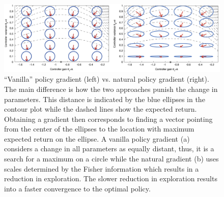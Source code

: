 \begin{figure}[!htb]
    \centering
    \includegraphics[width=1\linewidth]{Images/4_0_euclidean_vs_natural}
	\caption[``Vanilla'' policy gradient vs. natural policy gradient]{``Vanilla'' policy gradient (left) vs. natural policy gradient (right). The main difference is how the two approaches punish the change in parameters. This distance is 	indicated by the blue ellipses in the contour plot while the dashed lines show the expected return. Obtaining a gradient then corresponds to finding a vector pointing from the center of the ellipses to the location with maximum expected return on the ellipse. A vanilla policy gradient (a) considers a change in all parameters as equally distant, thus, it is a search for a maximum on a circle while the natural gradient (b) uses scales determined by the Fisher information which results in a reduction in exploration. The slower reduction in exploration results into a faster convergence to the optimal policy.}
\end{figure}

